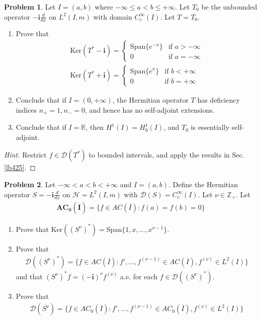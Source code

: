 \documentclass[12pt,b5paper,notitlepage]{article}
\theoremstyle{definition}
\newtheorem{prob}{\color{red}Problem}[section]
\theoremstyle{plain}
\newcommand{\ovl}{\overline}
\newcommand{\Dom}{\mathscr{D}}
\newcommand{\Span}{\mathrm{Span}}
\newcommand{\im}{\mathbf{i}}
\newcommand{\Zbb}{\mathbb Z}
\newcommand{\Rbb}{\mathbb R}
\newcommand{\Ker}{\mathrm{Ker}}
\newcommand{\MH}{\mathcal H}
\numberwithin{equation}{section}
\begin{document}
\begin{prob}
Let $I=(a,b)$ where $-\infty\leq a<b\leq+\infty$. Let $T_0$ be the unbounded operator $-\im\frac d{dx}$ on $L^2(I,m)$ with domain $C_c^\infty(I)$. Let $T=\ovl {T_0}$.
\begin{enumerate}
\item Prove that 
\begin{gather*}
\Ker(T^*-\im)=\left\{\begin{array}{ll}
\Span\{e^{-x}\}&\text{if }a>-\infty\\[0.5ex]
0&\text{if }a=-\infty
\end{array}
\right.\\[0.5ex]
\Ker(T^*+\im)=\left\{\begin{array}{ll}
\Span\{e^{x}\}&\text{if }b<+\infty\\[0.5ex]
0&\text{if }b=+\infty
\end{array}
\right.
\end{gather*}
\item Conclude that if $I=(0,+\infty)$, the Hermitian operator $T$ has deficiency indices $n_+=1,n_-=0$, and hence has no self-adjoint extensions.
\item Conclude that if $I=\Rbb$, then $H^1(I)=H^1_0(I)$, and $T_0$ is essentially self-adjoint.
\end{enumerate}
\end{prob}

\begin{proof}[Hint]
Restrict $f\in\Dom(T^*)$ to bounded intervals, and apply the results in Sec. \ref{lb425}.
\end{proof}





\begin{prob}\label{lb567}
Let $-\infty<a<b<+\infty$ and $I=(a,b)$. Define the Hermitian operator $S=-\im\frac d{dx}$ on $\MH=L^2(I,m)$ with $\Dom(S)=C_c^\infty(I)$. Let $\nu\in\Zbb_+$. Let
\begin{align*}
\pmb{AC_0(\ovl I)}=\{f\in AC(\ovl I):f(a)=f(b)=0\}
\end{align*}
\begin{enumerate}
\item Prove that $\Ker((S^\nu)^*)=\Span\{1,x,\dots,x^{\nu-1}\}$.
\item Prove that
\begin{gather}\label{eq270}
\Dom((S^\nu)^*)=\{f\in AC(\ovl I):f',\dots,f^{(\nu-1)}\in AC(\ovl I), f^{(\nu)}\in L^2(I)\}
\end{gather}
and that $(S^\nu)^*f=(-\im)^\nu f^{(\nu)}$ a.e. for each $f\in\Dom((S^\nu)^*)$.
\item Prove that
\begin{align*}
\Dom(\ovl{S^\nu})=\{f\in AC_0(\ovl I):f',\dots,f^{(\nu-1)}\in AC_0(\ovl I), f^{(\nu)}\in L^2(I)\}
\end{align*}
\end{enumerate}
\end{prob}
\end{document}
